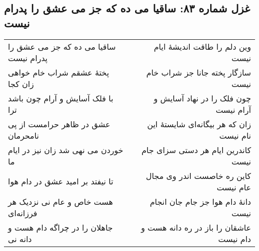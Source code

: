 \begin{center}
\section*{غزل شماره ۸۳: ساقیا می ده که جز می عشق را پدرام نیست}
\label{sec:083}
\begin{longtable}{l p{0.5cm} r}
ساقیا می ده که جز می عشق را پدرام نیست
&&
وین دلم را طاقت اندیشهٔ ایام نیست
\\
پختهٔ عشقم شراب خام خواهی زان کجا
&&
سازگار پخته جانا جز شراب خام نیست
\\
با فلک آسایش و آرام چون باشد ترا
&&
چون فلک را در نهاد آسایش و آرام نیست
\\
عشق در ظاهر حرامست از پی نامحرمان
&&
زان که هر بیگانه‌ای شایستهٔ این نام نیست
\\
خوردن می نهی شد زان نیز در ایام ما
&&
کاندرین ایام هر دستی سزای جام نیست
\\
تا نیفتد بر امید عشق در دام هوا
&&
کاین ره خاصست اندر وی مجال عام نیست
\\
هست خاص و عام نی نزدیک هر فرزانه‌ای
&&
دانهٔ دام هوا جز جام جان انجام نیست
\\
جاهلان را در چراگه دام هست و دانه نی
&&
عاشقان را باز در ره دانه هست و دام نیست
\\
\end{longtable}
\end{center}
